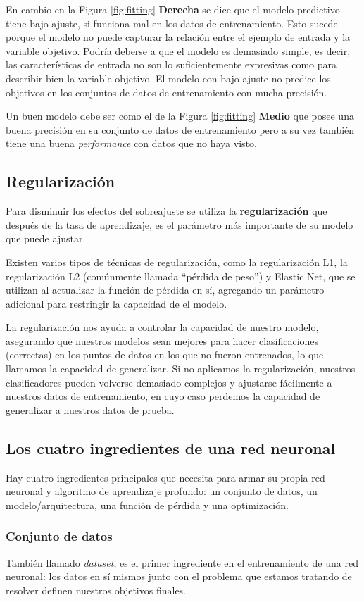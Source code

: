 \documentclass[14.5pt,a4paper]{article}
\begin{document}
En cambio en la Figura \ref{fig:fitting} \textbf{Derecha} se dice que el modelo predictivo tiene bajo-ajuste, si funciona mal en los datos de entrenamiento. Esto sucede porque el modelo no puede capturar la relación entre el ejemplo de entrada y la variable objetivo. Podría deberse a que el modelo es demasiado simple, es decir, las características de entrada no son lo suficientemente expresivas como para describir bien la variable objetivo. El modelo con bajo-ajuste no predice los objetivos en los conjuntos de datos de entrenamiento con mucha precisión.

Un buen modelo debe ser como el de la Figura \ref{fig:fitting} \textbf{Medio} que posee una buena precisión en su conjunto de datos de entrenamiento pero a su vez también tiene una buena \textit{performance} con datos que no haya visto.

\subsection{Regularización}
Para disminuir los efectos del sobreajuste se utiliza la \textbf{regularización} que después de la tasa de aprendizaje, es el parámetro más importante de su modelo que puede ajustar.

Existen varios tipos de técnicas de regularización, como la regularización L1, la regularización L2 (comúnmente llamada “pérdida de peso”) y Elastic Net, que se utilizan al actualizar la función de pérdida en sí, agregando un parámetro adicional para restringir la capacidad de el modelo.

La regularización nos ayuda a controlar la capacidad de nuestro modelo, asegurando que nuestros modelos sean mejores para hacer clasificaciones (correctas) en los puntos de datos en los que no fueron entrenados, lo que llamamos la capacidad de generalizar. Si no aplicamos la regularización, nuestros clasificadores pueden volverse demasiado complejos y ajustarse fácilmente a nuestros datos de entrenamiento, en cuyo caso perdemos la capacidad de generalizar a nuestros datos de prueba.

\subsection{Los cuatro ingredientes de una red neuronal}
Hay cuatro ingredientes principales que necesita para armar su propia red neuronal y algoritmo de aprendizaje profundo: un conjunto de datos, un modelo/arquitectura, una función de pérdida y una optimización.
\subsubsection{Conjunto de datos}
También llamado \textit{dataset}, es el primer ingrediente en el entrenamiento de una red neuronal: los datos en sí mismos junto con el problema que estamos tratando de resolver definen nuestros objetivos finales.
\end{document}

